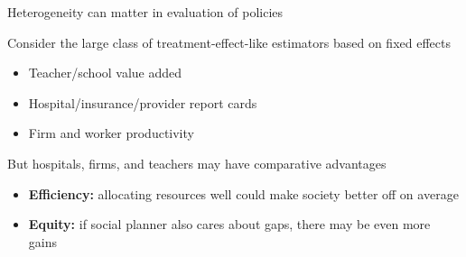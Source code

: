 \documentclass[t,aspectratio=169,11pt]{beamer}
\title{From Value Added to Welfare Added: \\ A Social Planner Approach to Education Policy and Statistics\vskip.3cm}
\author{Tanner S Eastmond\footnote{Department of Economics, University of California San Diego} \vskip.2cm Nathan Mather$^2$ \vskip.2cm Michael Ricks\footnote{Department of Economics, University of Michigan} \vskip.2cm Julian Betts\footnote{Department of Economics, University of California San Diego and NBER} }
\date{}
\begin{document}

\begin{frame}
    \titlepage
\end{frame}

\setcounter{footnote}{0}






\begin{frame}{Heterogeneity can matter in evaluation of policies}

    \vfill
    \begin{wideitemize}
        \item Consider the large class of treatment-effect-like estimators based on fixed effects
        \vspace{-12pt}
        \begin{itemize}
            \item Teacher/school value added
            \item Hospital/insurance/provider report cards
            \item Firm and worker productivity
        \end{itemize}
        
        \item But hospitals, firms, and teachers may have comparative advantages
        \begin{itemize}
            \item \textbf{Efficiency:} allocating resources well could make society better off on average
            \item \textbf{Equity:} if social planner also cares about gaps, there may be even more gains
        \end{itemize}
    \end{wideitemize}
    \vfill
    
\end{frame}
\end{document}
